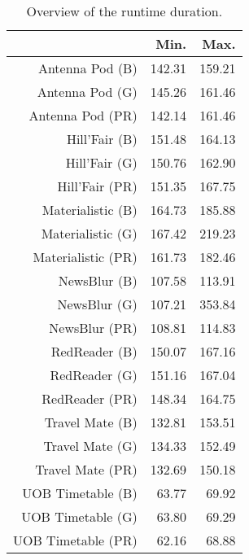 \begin{table}[ht]
\centering
\begin{tabular}{rrr}
  \hline
 & Min. & Max. \\ 
  \hline
Antenna Pod (B) & 142.31 & 159.21 \\ 
  Antenna Pod (G) & 145.26 & 161.46 \\ 
  Antenna Pod (PR) & 142.14 & 161.46 \\ 
  Hill'Fair (B) & 151.48 & 164.13 \\ 
  Hill'Fair (G) & 150.76 & 162.90 \\ 
  Hill'Fair (PR) & 151.35 & 167.75 \\ 
  Materialistic (B) & 164.73 & 185.88 \\ 
  Materialistic (G) & 167.42 & 219.23 \\ 
  Materialistic (PR) & 161.73 & 182.46 \\ 
  NewsBlur (B) & 107.58 & 113.91 \\ 
  NewsBlur (G) & 107.21 & 353.84 \\ 
  NewsBlur (PR) & 108.81 & 114.83 \\ 
  RedReader (B) & 150.07 & 167.16 \\ 
  RedReader (G) & 151.16 & 167.04 \\ 
  RedReader (PR) & 148.34 & 164.75 \\ 
  Travel Mate (B) & 132.81 & 153.51 \\ 
  Travel Mate (G) & 134.33 & 152.49 \\ 
  Travel Mate (PR) & 132.69 & 150.18 \\ 
  UOB Timetable (B) & 63.77 & 69.92 \\ 
  UOB Timetable (G) & 63.80 & 69.29 \\ 
  UOB Timetable (PR) & 62.16 & 68.88 \\ 
   \hline
\end{tabular}
\caption{Overview of the runtime duration.} 
\label{tab:results:rq1:summary:duration}
\end{table}
